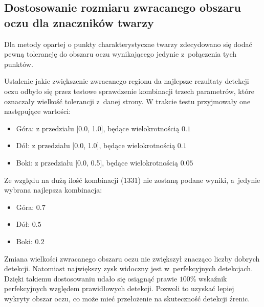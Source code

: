 \subsection{Dostosowanie rozmiaru zwracanego obszaru oczu dla znaczników twarzy} \label{section:facemark_eye_size}

Dla metody opartej o punkty charakterystyczne twarzy zdecydowano się dodać pewną tolerancję do obszaru oczu wynikającego jedynie z~połączenia tych punktów.

\par

Ustalenie jakie zwiększenie zwracanego regionu da najlepsze rezultaty detekcji oczu odbyło się przez testowe sprawdzenie kombinacji trzech parametrów, które oznaczały wielkość tolerancji z~danej strony. W trakcie testu przyjmowały one następujące wartości:

\begin{itemize}
    \item Góra: z przedziału [0.0, 1.0], będące wielokrotnością $0.1$
    \item Dół: z przedziału [0.0, 1.0], będące wielokrotnością $0.1$
    \item Boki: z przedziału [0.0, 0.5], będące wielokrotnością $0.05$
\end{itemize}

\par

Ze względu na dużą ilość kombinacji ($1331$) nie zostaną podane wyniki, a~jedynie wybrana najlepsza kombinacja:

\begin{itemize}
    \item Góra: $0.7$
    \item Dół: $0.5$
    \item Boki: $0.2$
\end{itemize}




Zmiana wielkości zwracanego obszaru oczu nie zwiększył znacząco liczby dobrych detekcji. Natomiast największy zysk widoczny jest w~perfekcyjnych detekcjach. Dzięki takiemu dostosowaniu udało się osiągnąć prawie $100\%$ wskaźnik perfekcyjnych względem prawidłowych detekcji. Pozwoli to uzyskać lepiej wykryty obszar oczu, co może mieć przełożenie na skuteczność detekcji źrenic.